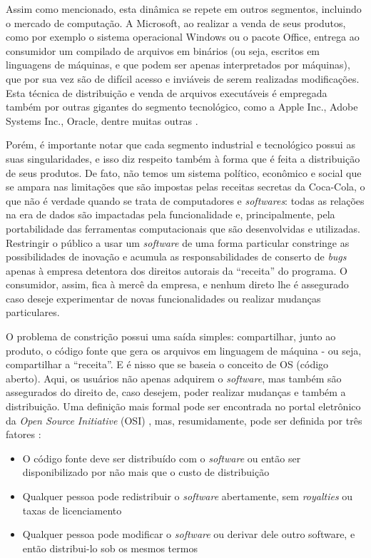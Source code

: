 \documentclass[12pt]{article}
\begin{document}
Assim como mencionado, esta dinâmica se repete em outros segmentos, incluindo o mercado de computação. A Microsoft, ao realizar a venda de seus produtos, como por exemplo o sistema operacional Windows ou o pacote Office, entrega ao consumidor um compilado de arquivos em  binários (ou seja, escritos em linguagens de máquinas, e que podem ser apenas interpretados por máquinas), que por sua vez são de difícil acesso e inviáveis de serem realizadas modificações. Esta técnica de distribuição e venda de arquivos executáveis é empregada também por outras gigantes do segmento tecnológico, como a Apple Inc., Adobe Systems Inc., Oracle, dentre muitas outras \cite{wiki_prop_source2020}.

Porém, é importante notar que cada segmento industrial e tecnológico possui as suas singularidades, e isso diz respeito também à forma que é feita a distribuição de seus produtos. De fato, não temos um sistema político, econômico e social que se ampara nas limitações que são impostas pelas receitas secretas da Coca-Cola, o que não é verdade quando se trata de computadores e \textit{softwares}: todas as relações na era de dados são impactadas pela funcionalidade e, principalmente, pela portabilidade das ferramentas computacionais que são desenvolvidas e utilizadas. Restringir o público a usar um \textit{software} de uma forma particular constringe as possibilidades de inovação e acumula as responsabilidades de conserto de \textit{bugs} apenas à empresa detentora dos direitos autorais da ``receita'' do programa. O consumidor, assim, fica à mercê da empresa, e nenhum direto lhe é assegurado caso deseje experimentar de novas funcionalidades ou realizar mudanças particulares.

O problema de constrição possui uma saída simples: compartilhar, junto ao produto, o código fonte que gera os arquivos em linguagem de máquina - ou seja, compartilhar a ``receita''. E é nisso que se baseia o conceito de OS (código aberto). Aqui, os usuários não apenas adquirem o \textit{software}, mas também são assegurados do direito de, caso desejem, poder realizar mudanças e também a distribuição. Uma definição mais formal pode ser encontrada no portal eletrônico da \textit{Open Source Initiative} (OSI) \cite{osi2020}, mas, resumidamente, pode ser definida por três fatores \cite{Weber2005}:
\begin{itemize}
\item O código fonte deve ser distribuído com o \textit{software} ou então ser disponibilizado por não mais que o custo de distribuição
\item Qualquer pessoa pode redistribuir o \textit{software} abertamente, sem \textit{royalties} ou taxas de licenciamento
\item Qualquer pessoa pode modificar o \textit{software} ou derivar dele outro software, e então distribui-lo sob os mesmos termos
\end{itemize}
\end{document}
